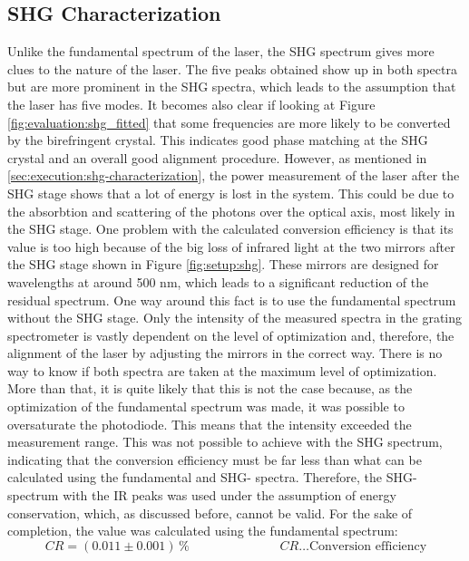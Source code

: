 \subsection{SHG Characterization}
Unlike the fundamental spectrum of the laser, the SHG spectrum gives more clues to the nature of the laser.
The five peaks obtained show up in both spectra but are more prominent in the SHG spectra, which leads to the assumption that the laser has five modes.
It becomes also clear if looking at Figure \ref{fig:evaluation:shg_fitted} that some frequencies are more likely to be converted by the birefringent crystal.
This indicates good phase matching at the SHG crystal and an overall good alignment procedure.
However, as mentioned in \ref{sec:execution:shg-characterization}, the power measurement of the laser after the SHG stage shows that a lot of energy is lost in the system.
This could be due to the absorbtion and scattering of the photons over the optical axis, most likely in the SHG stage.
One problem with the calculated conversion efficiency is that its value is too high because of the big loss of infrared light at the two mirrors after the SHG stage shown in Figure \ref{fig:setup:shg}.
These mirrors are designed for wavelengths at around 500 nm, which leads to a significant reduction of the residual spectrum.
One way around this fact is to use the fundamental spectrum without the SHG stage.
Only the intensity of the measured spectra in the grating spectrometer is vastly dependent on the level of optimization and, therefore, the alignment of the laser by adjusting the mirrors in the correct way.
There is no way to know if both spectra are taken at the maximum level of optimization.
More than that, it is quite likely that this is not the case because, as the optimization of the fundamental spectrum was made, it was possible to oversaturate the photodiode.
This means that the intensity exceeded the measurement range.
This was not possible to achieve with the SHG spectrum, indicating that the conversion efficiency must be far less than what can be calculated using the fundamental and SHG- spectra.
Therefore, the SHG- spectrum with the IR peaks was used under the assumption of energy conservation, which, as discussed before, cannot be valid.
For the sake of completion, the value was calculated using the fundamental spectrum:
\begin{equation}
    CR = (0.011 \pm 0.001) \hspace{2pt} \% \hspace{3cm} CR \ldots \text{Conversion efficiency}
\end{equation} 


